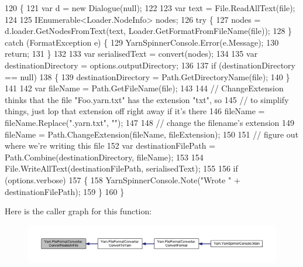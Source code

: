 \begin{DoxyCode}
120         \{
121             var d = \textcolor{keyword}{new} Dialogue(null);
122 
123             var text = File.ReadAllText(file);
124 
125             IEnumerable<Loader.NodeInfo> nodes;
126             \textcolor{keywordflow}{try} \{
127                 nodes = d.loader.GetNodesFromText(text, Loader.GetFormatFromFileName(file));
128             \} \textcolor{keywordflow}{catch} (FormatException e) \{
129                 YarnSpinnerConsole.Error(e.Message);
130                 \textcolor{keywordflow}{return};
131             \}
132 
133             var serialisedText = convert(nodes);
134 
135             var destinationDirectory = options.outputDirectory;
136 
137             \textcolor{keywordflow}{if} (destinationDirectory == null)
138             \{
139                 destinationDirectory = Path.GetDirectoryName(file);
140             \}
141 
142             var fileName = Path.GetFileName(file);
143 
144             \textcolor{comment}{// ChangeExtension thinks that the file "Foo.yarn.txt" has the extension "txt", so}
145             \textcolor{comment}{// to simplify things, just lop that extension off right away if it's there}
146             fileName = fileName.Replace(\textcolor{stringliteral}{".yarn.txt"}, \textcolor{stringliteral}{""});
147 
148             \textcolor{comment}{// change the filename's extension}
149             fileName = Path.ChangeExtension(fileName, fileExtension);
150 
151             \textcolor{comment}{// figure out where we're writing this file}
152             var destinationFilePath = Path.Combine(destinationDirectory, fileName);
153 
154             File.WriteAllText(destinationFilePath, serialisedText);
155 
156             \textcolor{keywordflow}{if} (options.verbose)
157             \{
158                 YarnSpinnerConsole.Note(\textcolor{stringliteral}{"Wrote "} + destinationFilePath);
159             \}
160         \}
\end{DoxyCode}


Here is the caller graph for this function\-:
\nopagebreak
\begin{figure}[H]
\begin{center}
\leavevmode
\includegraphics[width=350pt]{a00100_aa72838be584177b5592c31d73c0febdb_icgraph}
\end{center}
\end{figure}


